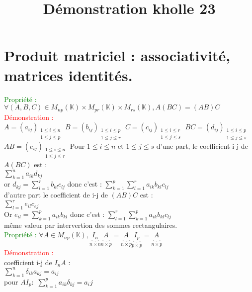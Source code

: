 \documentclass{article}
\begin{document}
\title{Démonstration kholle 23}
\date{}
\maketitle
	\renewcommand{\thesection}{\Roman{section}}
	\setlength{\parindent}{1.5cm}
	\section{ Produit matriciel : associativité, matrices identités.}
	\textcolor{green}{Propriété :}
	$\forall (A,B,C) \in M_{np}(\mathbb K) \times M_{pr}(\mathbb K) \times M_{rs}(\mathbb K), A(BC)=(AB)C$ \\
	\textcolor{red}{Démonstration :} \\
	$A=(a_{ij}){}_{\substack{1\leq i\leq n \\ 1\leq j\leq p}}$
	$B=(b_{ij}){}_{\substack{1\leq i\leq p \\ 1\leq j\leq r}}$
	 $C=(c_{ij}){}_{\substack{1\leq i\leq r \\ 1\leq j\leq s}}$
	 $BC=(d_{ij}){}_{\substack{1\leq i\leq p \\ 1\leq j\leq s}}$
	 $AB=(e_{ij}){}_{\substack{1\leq i\leq n \\ 1\leq j\leq r}}$
	 Pour $1 \leq i \leq n$ et $1 \leq j \leq s$ d'une part, le coefficient i-j de $A(BC)$ est :\\
	  $\sum_{k=1}^n a_{ik}d_{kj}$ \\
	 or $d_{kj}= \sum_{l=1}^r b_{kl} c_{lj}$ donc c'est : $\sum_{k=1}^p \sum_{l=1}^r a_{ik}b_{kl}c_{lj}$ \\
	 d'autre part le coefficient de i-j de $(AB)C$ est : \\
	 $\sum_{l=1}^r e_{il}c_{ej}$ \\
	 Or $e_{il}= \sum_{k=1}^p a_{ik} b_{kl}$ donc c'est : $\sum_{l=1}^r \sum_{k=1}^p a_{ik} b_{kl} c_{lj}$ \\
	 même valeur par intervertion des sommes rectangulaires. \\
	 \textcolor{green}{Propriété :}
	 $\forall A \in M_{np}(\mathbb K), \underbrace{I_n}_{n \times n} \underbrace{A_{}}_{n \times p} = \underbrace{A_{}}_{n \times p} \underbrace{I_p}_{p \times p} = \underbrace{A_{}}_{n \times p} $ \\
	 \textcolor{red}{Démonstration :} \\
	 coefficient  i-j de $I_nA$ : \\
	 $\sum_{k=1}^n \delta_{ik}a_{kj}=a_{ij}$ \\
	 pour $A I_p :$ $\sum_{k=1}^p a_{ik} \delta_{kj}=a_ij$
\end{document}
